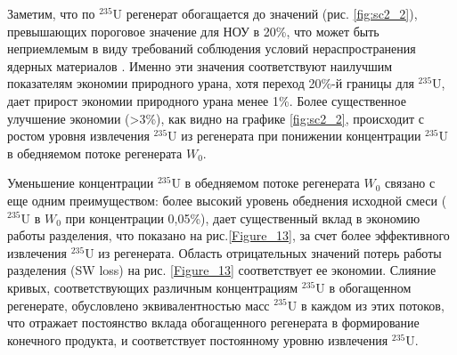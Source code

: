 Заметим, что по $^{235}$U регенерат обогащается до значений (рис.  \ref{fig:sc2_2}), превышающих пороговое значение для НОУ в 20\%, что может быть неприемлемым в виду требований соблюдения условий нераспространения ядерных материалов \cite{brownOriginsSignificanceLimit2016}. Именно эти значения соответствуют наилучшим показателям экономии природного урана, хотя переход 20\%-й границы для $^{235}$U, дает прирост экономии природного урана менее 1\%. Более существенное улучшение экономии (>3\%), как видно на графике \ref{fig:sc2_2}, происходит с ростом уровня извлечения $^{235}$U из регенерата при понижении концентрации $^{235}$U в обедняемом потоке регенерата $W_0$. 

Уменьшение концентрации $^{235}$U в обедняемом потоке регенерата $W_0$ связано с еще одним преимуществом: более высокий уровень обеднения исходной смеси ($^{235}$U в $W_0$ при концентрации 0,05\%), дает существенный вклад в экономию работы разделения, что показано на рис.\ref{Figure_13}, за счет более эффективного извлечения $^{235}$U из регенерата. Область отрицательных значений потерь работы разделения (SW loss) на рис. \ref{Figure_13} соответствует ее экономии. Слияние кривых, соответствующих различным концентрациям $^{235}$U в обогащенном регенерате, обусловлено эквивалентностью масс $^{235}$U в каждом из этих потоков, что отражает постоянство вклада обогащенного регенерата в формирование конечного продукта, и соответствует постоянному уровню извлечения $^{235}$U.



